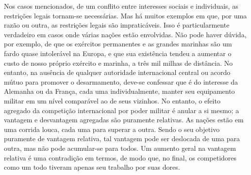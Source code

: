 \documentclass[12pt]{article}
\begin{document}
Nos casos mencionados, de um conflito entre interesses sociais e individuais, as restrições legais tornam-se necessárias. Mas há muitos exemplos em que, por uma razão ou outra, as restrições legais são impraticáveis. Isso é particularmente verdadeiro em casos onde várias nações estão envolvidas. Não pode haver dúvida, por exemplo, de que os exércitos permanentes e as grandes marinhas são um fardo quase intolerável na Europa, e que sua existência tendeu a aumentar o custo de nosso próprio exército e marinha, a três mil milhas de distância. No entanto, na ausência de qualquer autoridade internacional central ou acordo mútuo para promover o desarmamento, deve-se confessar que é do interesse da Alemanha ou da França, cada uma individualmente, manter seu equipamento militar em um nível comparável ao de seus vizinhos. No entanto, o efeito agregado da competição internacional por poder militar é anular a si mesmo; a vantagem e desvantagem agregadas são puramente relativas. As nações estão em uma corrida louca, cada uma para superar a outra. Sendo o seu objetivo puramente de vantagem relativa, tal vantagem pode ser deslocada de uma para outra, mas não pode acumular-se para todos. Um aumento geral na vantagem relativa é uma contradição em termos, de modo que, no final, os competidores como um todo tiveram apenas seu trabalho por suas dores.
\end{document}
